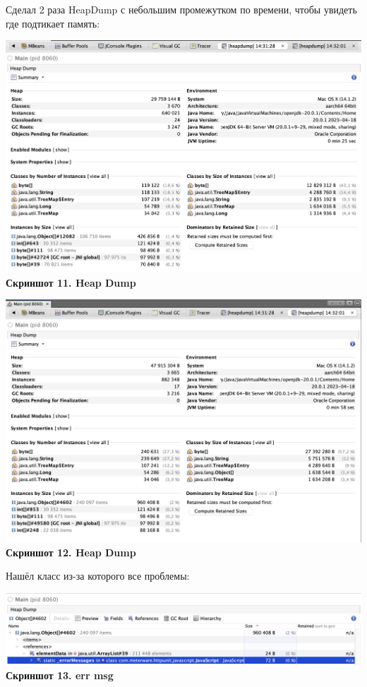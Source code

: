 \documentclass{article}
\begin{document}
Сделал 2 раза HeapDump с небольшим промежутком по времени, чтобы увидеть где подтикает память:
\begin{center}
    \includegraphics[width=.8\textwidth]{heap1.png}\\
    \textbf{Скриншот 11. Heap Dump}
\end{center}

\begin{center}
    \includegraphics[width=.8\textwidth]{heap2.png}\\
    \textbf{Скриншот 12. Heap Dump}
\end{center}

Нашёл класс из-за которого все проблемы:

\begin{center}
    \includegraphics[width=.8\textwidth]{err.png}\\
    \textbf{Скриншот 13. err msg}
\end{center}
\end{document}

